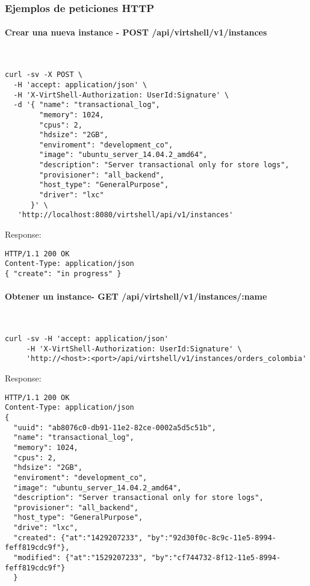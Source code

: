 \subsubsection{Ejemplos de peticiones HTTP}

\paragraph{Crear una nueva instance - POST /api/virtshell/v1/instances} ~\\


\begin{lstlisting}[style=json]
curl -sv -X POST \
  -H 'accept: application/json' \
  -H 'X-VirtShell-Authorization: UserId:Signature' \
  -d '{ "name": "transactional_log",
        "memory": 1024,
        "cpus": 2,
        "hdsize": "2GB",
        "enviroment": "development_co",
        "image": "ubuntu_server_14.04.2_amd64",
        "description": "Server transactional only for store logs", 
        "provisioner": "all_backend",
        "host_type": "GeneralPurpose",
        "driver": "lxc"
      }' \
   'http://localhost:8080/virtshell/api/v1/instances'
\end{lstlisting}

Response:

\begin{lstlisting}[style=json]
HTTP/1.1 200 OK
Content-Type: application/json
{ "create": "in progress" }
\end{lstlisting}

\paragraph{Obtener un instance- GET /api/virtshell/v1/instances/:name} ~\\

\begin{lstlisting}[style=json]
curl -sv -H 'accept: application/json' 
     -H 'X-VirtShell-Authorization: UserId:Signature' \ 
     'http://<host>:<port>/api/virtshell/v1/instances/orders_colombia'
\end{lstlisting}

Response:

\begin{lstlisting}[style=json]
HTTP/1.1 200 OK
Content-Type: application/json
{
  "uuid": "ab8076c0-db91-11e2-82ce-0002a5d5c51b",
  "name": "transactional_log",
  "memory": 1024,
  "cpus": 2,
  "hdsize": "2GB",
  "enviroment": "development_co",
  "image": "ubuntu_server_14.04.2_amd64",
  "description": "Server transactional only for store logs", 
  "provisioner": "all_backend",
  "host_type": "GeneralPurpose",
  "drive": "lxc",
  "created": {"at":"1429207233", "by":"92d30f0c-8c9c-11e5-8994-feff819cdc9f"},
  "modified": {"at":"1529207233", "by":"cf744732-8f12-11e5-8994-feff819cdc9f"}
  }
\end{lstlisting}

